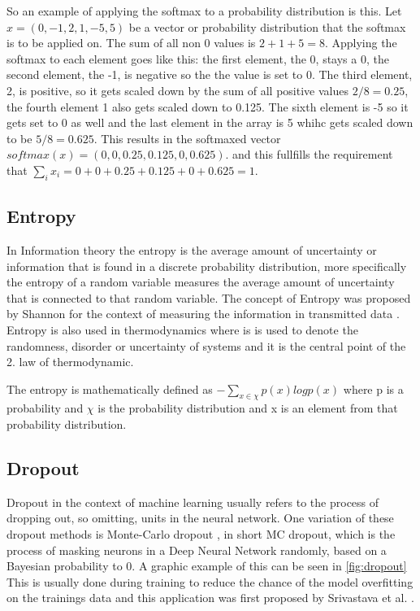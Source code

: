 So an example of applying the softmax to a probability distribution is this. Let $x= (0, -1, 2, 1, -5, 5)$ be a vector or probability distribution that the softmax is to be applied on. The sum of all non 0 values is $2+1+5=8$. Applying the softmax to each element goes like this: the first element, the 0, stays a 0, the second element, the -1, is negative so the the value is set to 0. The third element, 2, is positive, so it gets scaled down by the sum of all positive values $2/8=0.25$, the fourth element 1 also gets scaled down to 0.125. The sixth element is -5 so it gets set to 0 as well and the last element in the array is 5 whihc gets scaled down to be $5/8=0.625$.
This results in the softmaxed vector $softmax(x)=(0,0,0.25,0.125,0,0.625)$. and this fullfills the requirement that $\sum_ix_i = 0+0+0.25+0.125+0+0.625= 1$. 

\subsection{Entropy}
\label{entropy}
In Information theory the entropy is the average amount of uncertainty or information that is found in a discrete probability distribution, more specifically the entropy of a random variable measures the average amount of uncertainty that is connected to that random variable.
The concept of Entropy was proposed by Shannon for the context of measuring the information in transmitted data \cite{shannonentropy}. Entropy is also used in thermodynamics where is is used to denote the randomness, disorder or uncertainty of systems and it is the central point of the 2. law of thermodynamic.

The entropy is mathematically defined as $- \sum_{x\in \chi} p(x) log p(x)$ where p is a probability and $\chi$ is the probability distribution and x is an element from that probability distribution.


\subsection{Dropout}
Dropout in the context of machine learning usually refers to the process of dropping out, so omitting, units in the neural network. 
One variation of these dropout methods is Monte-Carlo dropout \cite{gal2016dropoutbayesianapproximationrepresenting}, in short MC dropout, which is the process of masking neurons in a Deep Neural Network randomly, based on a Bayesian probability to 0. A graphic example of this can be seen in \autoref{fig:dropout}
This is usually done during training to reduce the chance of the model overfitting on the trainings data and this application was first proposed by Srivastava et al. \cite{JMLR:v15:srivastava14a}. 

